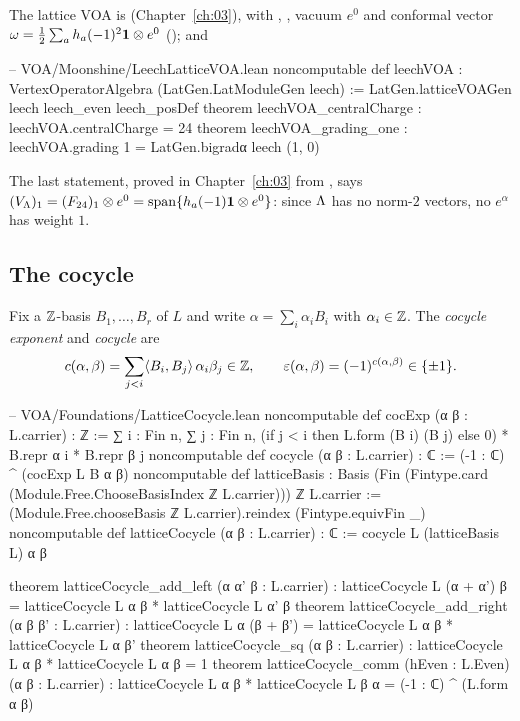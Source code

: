 The lattice VOA is  (Chapter~\ref{ch:03}), with
, , vacuum $e^0$ and conformal
vector $\omega=\tfrac12\sum_a h_a(-1)^2\mathbf{1}\otimes e^0$ (); and
\begin{leancode}
-- VOA/Moonshine/LeechLatticeVOA.lean
noncomputable def leechVOA : VertexOperatorAlgebra (LatGen.LatModuleGen leech) :=
  LatGen.latticeVOAGen leech leech_even leech_posDef
theorem leechVOA_centralCharge : leechVOA.centralCharge = 24
theorem leechVOA_grading_one :
    leechVOA.grading 1 = LatGen.bigradα leech (1, 0)
\end{leancode}
The last statement, proved in Chapter~\ref{ch:03} from , says
$(V_{\Lambda})_1=(F_{24})_1\otimes e^0=\operatorname{span}\{h_a(-1)\mathbf{1}\otimes e^0\}$: since
${\Lambda}$ has no norm-$2$ vectors, no $e^\alpha$ has weight $1$.

\subsection{The cocycle}\label{ch04:sec:cocycle}

\begin{definition}\label{ch04:def:cocycle}
Fix a ${\mathbb{Z}}$-basis $B_1,\dots,B_r$ of $L$ and write $\alpha=\sum_i\alpha_iB_i$ with $\alpha_i\in{\mathbb{Z}}$.
The \emph{cocycle exponent} and \emph{cocycle} are
\begin{equation*}
  c(\alpha,\beta)=\sum_{j<i}\langle B_i,B_j\rangle\,\alpha_i\beta_j\in{\mathbb{Z}},\qquad
  \varepsilon(\alpha,\beta)=(-1)^{c(\alpha,\beta)}\in\{\pm1\}.
\end{equation*}
\end{definition}

\begin{leancode}
-- VOA/Foundations/LatticeCocycle.lean
noncomputable def cocExp (α β : L.carrier) : ℤ :=
  ∑ i : Fin n, ∑ j : Fin n,
    (if j < i then L.form (B i) (B j) else 0) * B.repr α i * B.repr β j
noncomputable def cocycle (α β : L.carrier) : ℂ := (-1 : ℂ) ^ (cocExp L B α β)
noncomputable def latticeBasis :
    Basis (Fin (Fintype.card (Module.Free.ChooseBasisIndex ℤ L.carrier))) ℤ L.carrier :=
  (Module.Free.chooseBasis ℤ L.carrier).reindex (Fintype.equivFin _)
noncomputable def latticeCocycle (α β : L.carrier) : ℂ := cocycle L (latticeBasis L) α β

theorem latticeCocycle_add_left (α α' β : L.carrier) :
    latticeCocycle L (α + α') β = latticeCocycle L α β * latticeCocycle L α' β
theorem latticeCocycle_add_right (α β β' : L.carrier) :
    latticeCocycle L α (β + β') = latticeCocycle L α β * latticeCocycle L α β'
theorem latticeCocycle_sq (α β : L.carrier) :
    latticeCocycle L α β * latticeCocycle L α β = 1
theorem latticeCocycle_comm (hEven : L.Even) (α β : L.carrier) :
    latticeCocycle L α β * latticeCocycle L β α = (-1 : ℂ) ^ (L.form α β)
\end{leancode}

